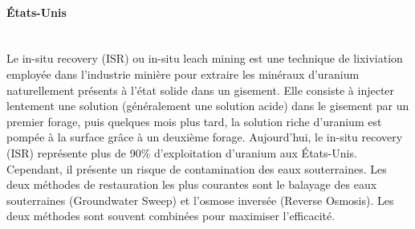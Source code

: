 \documentclass{article}
\begin{document}
\paragraph{États-Unis \\ \\}
Le in-situ recovery (ISR) ou in-situ leach mining est une technique de lixiviation employée dans l’industrie minière pour extraire les minéraux d’uranium naturellement présents à l'état solide dans un gisement. Elle consiste à injecter lentement une solution (généralement une solution acide) dans le gisement par un premier forage, puis quelques mois plus tard, la solution riche d’uranium est pompée à la surface grâce à un deuxième forage. 
Aujourd’hui, le in-situ recovery (ISR) représente plus de 90\% d’exploitation d’uranium aux États-Unis. Cependant, il présente un risque de contamination des eaux souterraines.
Les deux méthodes de restauration les plus courantes sont le balayage des eaux souterraines (Groundwater Sweep) et l'osmose inversée (Reverse Osmosis).
Les deux méthodes sont souvent combinées pour maximiser l’efficacité.%
\end{document}
